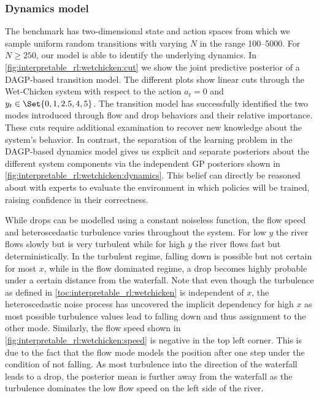 \subsubsection{Dynamics model}
\label{toc:interpretable_rl:dynamics_model}
The benchmark has two-dimensional state and action spaces from which we sample uniform random transitions with varying $N$ in the range \numrange{100}{5000}.
For $N \geq 250$, our model is able to identify the underlying dynamics.
In \cref{fig:interpretable_rl:wetchicken:cut} we show the joint predictive posterior of a DAGP-based transition model.
The different plots show linear cuts through the Wet-Chicken system with respect to the action $a_t = 0$ and $y_t \in \Set{0, 1, 2.5, 4, 5}$.
The transition model has successfully identified the two modes introduced through flow and drop behaviors and their relative importance.
These cuts require additional examination to recover new knowledge about the system's behavior.
In contrast, the separation of the learning problem in the DAGP-based dynamics model gives us explicit and separate posteriors about the different system components via the independent GP posteriors shown in \cref{fig:interpretable_rl:wetchicken:dynamics}.
This belief can directly be reasoned about with experts to evaluate the environment in which policies will be trained, raising confidence in their correctness.

While drops can be modelled using a constant noiseless function, the flow speed and heteroscedastic turbulence varies throughout the system.
For low $y$ the river flows slowly but is very turbulent while for high $y$ the river flows fast but deterministically.
In the turbulent regime, falling down is possible but not certain for most $x$, while in the flow dominated regime, a drop becomes highly probable under a certain distance from the waterfall.
Note that even though the turbulence as defined in \cref{toc:interpretable_rl:wetchicken} is independent of $x$, the heteroscedastic noise process has uncovered the implicit dependency for high $x$ as most possible turbulence values lead to falling down and thus assignment to the other mode.
Similarly, the flow speed shown in \cref{fig:interpretable_rl:wetchicken:speed} is negative in the top left corner.
This is due to the fact that the flow mode models the position after one step under the condition of not falling.
As most turbulence into the direction of the waterfall leads to a drop, the posterior mean is further away from the waterfall as the turbulence dominates the low flow speed on the left side of the river.


